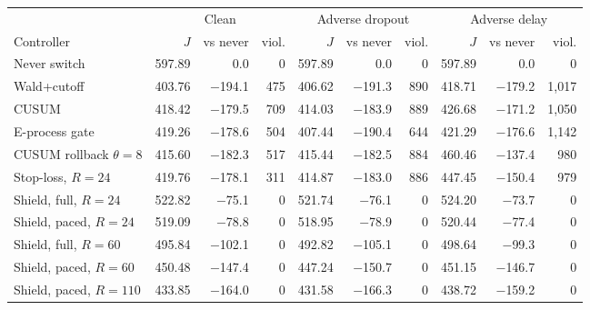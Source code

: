\begin{tabular}{@{}l r r r r r r r r r @{}}
\toprule
 & \multicolumn{3}{c}{Clean} & \multicolumn{3}{c}{Adverse dropout} & \multicolumn{3}{c}{Adverse delay} \\
\cmidrule(lr){2-4}\cmidrule(lr){5-7}\cmidrule(lr){8-10}
Controller & $J$ & vs never & viol. & $J$ & vs never & viol. & $J$ & vs never & viol. \\
\midrule
Never switch & 597.89 & 0.0 & 0 & 597.89 & 0.0 & 0 & 597.89 & 0.0 & 0 \\
Wald+cutoff & 403.76 & $-$194.1 & 475 & 406.62 & $-$191.3 & 890 & 418.71 & $-$179.2 & 1{,}017 \\
CUSUM & 418.42 & $-$179.5 & 709 & 414.03 & $-$183.9 & 889 & 426.68 & $-$171.2 & 1{,}050 \\
E-process gate & 419.26 & $-$178.6 & 504 & 407.44 & $-$190.4 & 644 & 421.29 & $-$176.6 & 1{,}142 \\
CUSUM rollback $\theta=8$ & 415.60 & $-$182.3 & 517 & 415.44 & $-$182.5 & 884 & 460.46 & $-$137.4 & 980 \\
Stop-loss, $R=24$ & 419.76 & $-$178.1 & 311 & 414.87 & $-$183.0 & 886 & 447.45 & $-$150.4 & 979 \\
\midrule
Shield, full, $R=24$ & 522.82 & $-$75.1 & 0 & 521.74 & $-$76.1 & 0 & 524.20 & $-$73.7 & 0 \\
Shield, paced, $R=24$ & 519.09 & $-$78.8 & 0 & 518.95 & $-$78.9 & 0 & 520.44 & $-$77.4 & 0 \\
Shield, full, $R=60$ & 495.84 & $-$102.1 & 0 & 492.82 & $-$105.1 & 0 & 498.64 & $-$99.3 & 0 \\
Shield, paced, $R=60$ & 450.48 & $-$147.4 & 0 & 447.24 & $-$150.7 & 0 & 451.15 & $-$146.7 & 0 \\
Shield, paced, $R=110$ & 433.85 & $-$164.0 & 0 & 431.58 & $-$166.3 & 0 & 438.72 & $-$159.2 & 0 \\
\bottomrule
\end{tabular}

